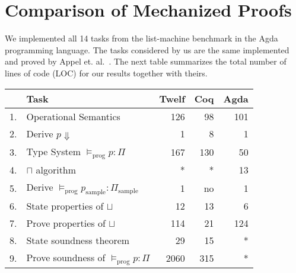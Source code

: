 \documentclass[review]{elsarticle}
\theoremstyle{definition}
\begin{document}
\section{Comparison of Mechanized Proofs}\label{sec:comparison}

We implemented all 14 tasks from the list-machine benchmark in the Agda programming language.
The tasks considered by us are the same implemented and proved by Appel et. al.~\cite{Appel07}.
The next table summarizes the total number of lines of code (LOC) for our results together with theirs.

\begin{table}[!htb]
\begin{tabular}{rl|rrr}
    & Task                                         & \multicolumn{1}{l}{Twelf} & \multicolumn{1}{l}{Coq} & \multicolumn{1}{l}{Agda} \\ \hline
1.  & Operational Semantics                        & 126                       & 98                      & 101                      \\
2.  & Derive $p \Downarrow$                        & 1                         & 8                       & 1                        \\ \hline
3.  & Type System $\vDash_{\textrm{prog}} p : \Pi$ & 167                       & 130                     & 50                       \\
4.  & $\sqcap$ algorithm                           & *                         & *                       & 13                       \\
5.  & Derive $\vDash_{\textrm{prog}} p_{\textrm{sample}} : \Pi_{\textrm{sample}}$
                                                   & 1                         & no                      & 1                        \\
6.  & State properties of $\sqcup$                 & 12                        & 13                      & 6                        \\
7.  & Prove properties of $\sqcup$                 & 114                       & 21                      & 124                      \\
8.  & State soundness theorem                      & 29                        & 15                      & *                        \\
9.  & Prove soundness of $\vDash_{\textrm{prog}} p : \Pi$
                                                   & 2060                      & 315                     & *                        \\ \hline

\end{tabular}
\end{table}
\end{document}
